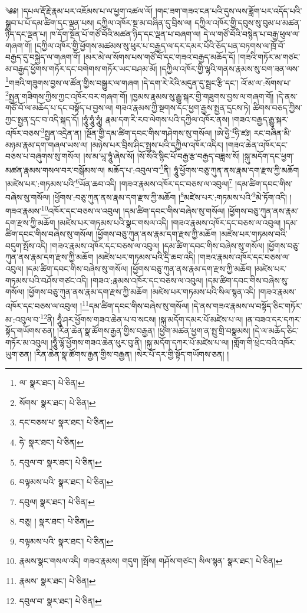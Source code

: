 \setcounter{footnote}{0} 
༄༅། །དཔལ་རྡོ་རྗེ་རྣམ་པར་འཇོམས་པ་ལ་ཕྱག་འཚལ་ལོ། །གང་ཟག་གཟའ་ངན་པའི་དུས་ལས་ཟློག་པར་འདོད་པའི་སྒྲུབ་པ་པོ་དམ་ཚིག་དང་ལྡན་པས། དཀྱིལ་འཁོར་སྔ་མ་བཞིན་དུ་བྲིས་ལ། དཀྱིལ་འཁོར་གྱི་དབུས་སུ་བུམ་པ་མཚན་ཉིད་དང་ལྡན་པ། ཁ་དོག་སྔོན་པོ་གཙོ་བོའི་མཚན་ཉིད་དང་ལྡན་པ་བཞག་ལ། དེ་ལ་གཙོ་བོའི་བསྙེན་པ་བརྒྱ་ཕུལ་ལ་གཞག་གོ། །དཀྱིལ་འཁོར་གྱི་ཕྱོགས་མཚམས་སུ་ཕུར་པ་བརྒྱད་ལ་དར་དམར་པོའི་ཅོད་པན་བཏགས་ལ་ཁྲོ་བོ་བརྒྱད་དུ་བསྐྱེད་ལ་གཞག་གོ། །མར་མེ་ལ་སོགས་པས་གཙོ་བོ་དང་གཟའ་བརྒྱད་མཆོད་དོ། །གཟའི་གཏོར་མ་གཙང་མ་བརྒྱད་ཕྱོགས་གཏོར་དང་བགེགས་གཏོར་ཡང་བཤམ་མོ། །དཀྱིལ་འཁོར་གྱི་ལྷའི་གནས་རྣམས་སུ་བག་ཟན་ལས་\footnote{ལ་  སྣར་ཐང་།  པེ་ཅིན། }གཟའི་གཟུགས་བྱས་ལ་ཚོན་གྱིས་བསྒྱུར་ལ་གཞག །དེ་དག་རེ་རེའི་མདུན་དུ་སྦྲང་རྩི་དང་། འོ་མ་ལ་:སོགས་པ་\footnote{སོགས་  སྣར་ཐང་།  པེ་ཅིན། }སྤྱན་གཟིགས་ཀྱིས་ཀྱང་འཁོར་བར་གཞག་གོ། །ཁྱམས་རྣམས་སུ་རྒྱུ་སྐར་གྱི་གཟུགས་བྱས་ལ་གཞག་གོ། །དེ་ནས་གཙོ་བོ་ལ་མཆོད་པ་དང་བསྟོད་པ་བྱས་ལ། གཟའ་རྣམས་ཀྱི་སྔགས་དང་ཕྱག་རྒྱས་སྤྱན་དྲངས་ཏེ། ཚིགས་བཅད་ཀྱིས་ཀྱང་སྤྱན་དྲང་བ་འདི་སྐད་དོ། །ཧཱུཾ་ཧཱུཾ་ཧཱུཾ། རྣམ་དག་རི་རབ་ལེགས་པའི་དཀྱིལ་འཁོར་ནས། །གཟའ་བརྒྱད་རྒྱུ་སྐར་འཁོར་བཅས་\footnote{དང་བཅས་པ་  སྣར་ཐང་།  པེ་ཅིན། }སྤྱན་འདྲེན་ན། །སྔོན་གྱི་དམ་ཚིག་དབང་གིས་གཤེགས་སུ་གསོལ། །ཨེ་ཧྱེ་\footnote{ཧེ་  སྣར་ཐང་།  པེ་ཅིན། }ཧི་ཛཿ། རང་བཞིན་མི་མཉམ་རྣམ་དག་གཞལ་ཡས་ལ། །མཉེས་པར་བྲིས་ཤིང་སྤྲས་པའི་དཀྱིལ་འཁོར་འདིར། །གཟའ་ཆེན་འཁོར་དང་བཅས་པ་བཞུགས་སུ་གསོལ། །ས་མ་ཡཱ་ཧཱུཾ་ཞེས་སོ། །སོ་སོའི་སྙིང་པོ་བརྒྱ་རྩ་བརྒྱད་བཟླས་སོ། །སྐུ་མདོག་དང་ཕྱག་མཚན་རྣམས་གསལ་བར་བསྒོམས་ལ། མཆོད་པ་:འབུལ་བ་\footnote{དབུལ་བ་  སྣར་ཐང་།  པེ་ཅིན། }ནི། ཧཱུཾ་ཕྱོགས་བཅུ་ཀུན་ནས་རྣམ་དག་རྫས་ཀྱི་མཆོག །མཛེས་པར་:གཏམས་པའི་\footnote{བལྟམས་པའི་  སྣར་ཐང་།  པེ་ཅིན། }ཡོན་ཆབ་འདི། །གཟའ་རྣམས་འཁོར་དང་བཅས་ལ་འབུལ།\footnote{དབུལ།  སྣར་ཐང་།  པེ་ཅིན། } །དམ་ཚིག་དབང་གིས་བཞེས་སུ་གསོལ། །ཕྱོགས་:བཅུ་ཀུན་ནས་རྣམ་དག་རྫས་ཀྱི་མཆོག །\footnote{བཅུ། །  སྣར་ཐང་།  པེ་ཅིན། }མཛེས་པར་:གཏམས་པའི་\footnote{བལྟམས་པའི་  སྣར་ཐང་།  པེ་ཅིན། }མེ་ཏོག་འདི། །གཟའ་རྣམས་\footnote{རྣམས་སྣང་གསལ་འདི། གཟའ་རྣམས། གདུག །སྤོས། གཤོས་གཙང་། སིལ་སྙན་  སྣར་ཐང་།  པེ་ཅིན། }འཁོར་དང་བཅས་ལ་འབུལ། །དམ་ཚིག་དབང་གིས་བཞེས་སུ་གསོལ། །ཕྱོགས་བཅུ་ཀུན་ནས་རྣམ་དག་རྫས་ཀྱི་མཆོག །མཛེས་པར་གཏམས་པའི་སྣང་གསལ་འདི། །གཟའ་རྣམས་འཁོར་དང་བཅས་ལ་འབུལ། །དམ་ཚིག་དབང་གིས་བཞེས་སུ་གསོལ། །ཕྱོགས་བཅུ་ཀུན་ནས་རྣམ་དག་རྫས་ཀྱི་མཆོག །མཛེས་པར་གཏམས་བའི་བདུག་སྤོས་འདི། །གཟའ་རྣམས་འཁོར་དང་བཅས་ལ་འབུལ། །དམ་ཚིག་དབང་གིས་བཞེས་སུ་གསོལ། །ཕྱོགས་བཅུ་ཀུན་ནས་རྣམ་དག་རྫས་ཀྱི་མཆོག །མཛེས་པར་གཏམས་པའི་དྲི་ཆབ་འདི། །གཟའ་རྣམས་འཁོར་དང་བཅས་ལ་འབུལ། །དམ་ཚིག་དབང་གིས་བཞེས་སུ་གསོལ། །ཕྱོགས་བཅུ་ཀུན་ནས་རྣམ་དག་རྫས་ཀྱི་མཆོག །མཛེས་པར་གཏམས་པའི་བཤོས་གཙང་འདི། །གཟའ་:རྣམས་འཁོར་དང་བཅས་ལ་འབུལ། །དམ་ཚིག་དབང་གིས་བཞེས་སུ་གསོལ། །ཕྱོགས་བཅུ་ཀུན་ནས་རྣམ་དག་རྫས་ཀྱི་མཆོག །མཛེས་པར་གཏམས་པའི་སིལ་སྙན་འདི། །གཟའ་རྣམས་འཁོར་དང་བཅས་ལ་འབུལ། །\footnote{རྣམས་  སྣར་ཐང་།  པེ་ཅིན། }དམ་ཚིག་དབང་གིས་བཞེས་སུ་གསོལ། །དེ་ནས་གཟའ་རྣམས་ལ་བསྟོད་ཅིང་གཏོར་མ་:འབུལ་བ་\footnote{དབུལ་བ་  སྣར་ཐང་།  པེ་ཅིན། }ནི། ཧཱུྃ་ཤར་ཕྱོགས་གཟའ་ཆེན་པ་བ་སངས། །སྐུ་མདོག་དམར་པོ་མཛེས་པ་ལ། །ན་བཟའ་དར་དཀར་སྟོད་གཡོགས་ཅན། །རིན་ཆེན་སྣ་ཚོགས་རྒྱན་གྱིས་བརྒྱན། །ཕྱག་མཚན་ཕྱག་ན་སྤུ་གྲི་བསྣམས། །དེ་ལ་མཆོད་ཅིང་གཏོར་མ་འབུལ། །ཧཱུྃ་ལྷོ་ཕྱོགས་གཟའ་ཆེན་ཕུར་བུ་ནི། །སྐུ་མདོག་དཀར་པོ་མཛེས་པ་ལ། །གློག་གི་ཕྲེང་བའི་འཁོར་ཡུག་ཅན། །རིན་ཆེན་སྣ་ཚོགས་རྒྱན་གྱིས་བརྒྱན། །སེར་པོ་དར་གྱི་སྟོད་གཡོགས་ཅན། །
